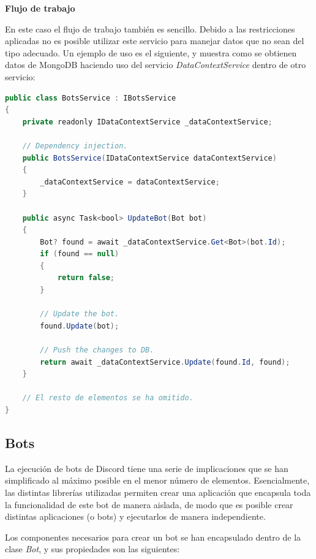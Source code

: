 \medskip 

\textbf{Flujo de trabajo}

En este caso el flujo de trabajo también es sencillo. Debido a las restricciones aplicadas no es posible utilizar este servicio para manejar datos que no sean del tipo adecuado. Un ejemplo de uso es el siguiente, y muestra como se obtienen datos de MongoDB haciendo uso del servicio \textit{DataContextService} dentro de otro servicio:

\begin{lstlisting}[language=java]
public class BotsService : IBotsService
{
    private readonly IDataContextService _dataContextService;

	// Dependency injection.
    public BotsService(IDataContextService dataContextService)
    {
        _dataContextService = dataContextService;
    }
    
    public async Task<bool> UpdateBot(Bot bot)
    {
        Bot? found = await _dataContextService.Get<Bot>(bot.Id);
        if (found == null)
        {
            return false;
        }

        // Update the bot.
        found.Update(bot);

        // Push the changes to DB.
        return await _dataContextService.Update(found.Id, found);
    }
    
    // El resto de elementos se ha omitido.
}
\end{lstlisting}





\subsection{Bots}

La ejecución de bots de Discord tiene una serie de implicaciones que se han simplificado al máximo posible en el menor número de elementos. Esencialmente, las distintas librerías utilizadas permiten crear una aplicación que encapsula toda la funcionalidad de este bot de manera aislada, de modo que es posible crear distintas aplicaciones (o bots) y ejecutarlos de manera independiente.

Los componentes necesarios para crear un bot se han encapsulado dentro de la clase \textit{Bot}, y sus propiedades son las siguientes:

